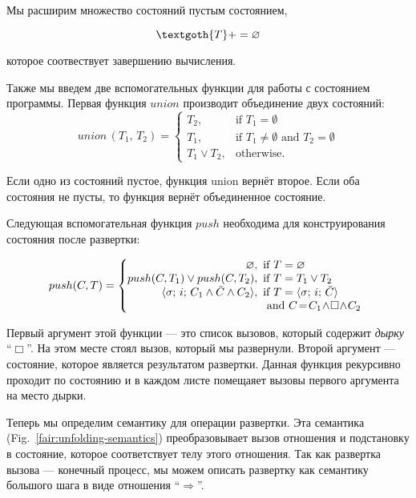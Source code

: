 Мы расширим множество состояний пустым состоянием,

\[
\textgoth{T} += \emptyset
\]

\noindent которое соотвествует завершению вычисления.

Также мы введем две вспомогательных функции для работы с состоянием программы. Первая функция $union$ производит объединение двух состояний:
\[
union\,(T_1,\, T_2) =
\left\{
\begin{array}{rl}
T_2, & \mbox{if } T_1 = \emptyset \\
T_1, & \mbox{if } T_1 \not= \emptyset \mbox{ and } T_2 = \emptyset \\
T_1 \lor T_2, & \mbox{otherwise}.
\end{array}
\right.
\]

Если одно из состояний пустое, функция union вернёт второе. Если оба состояния не пусты, то функция вернёт объединенное состояние.

Следующая вспомогательная функция $push$ необходима для конструирования состояния после развертки:

\[
push(C, T) =
\left\{
\begin{array}{rl}
\emptyset, &  \!\!\!\mbox{if } T = \emptyset \\
\!\!\!push(C, T_1) \lor push(C, T_2), & \!\!\!\mbox{if } T = T_1 \lor T_2 \\
\inbr{\sigma;\, i;\, C_1 \land \bar{C} \land C_2}, & \!\!\!\mbox{if } T = \inbr{\sigma;\, i;\, \bar{C}} \\  & \!\!\!\mbox{ and } C \!=\! C_1\! \land\! \Box\! \land\! C_2
\end{array}
\right.
\]

Первый аргумент этой функции --- это список вызовов, который содержит \emph{дырку} ``$\Box$''. На этом месте стоял вызов, который мы развернули. Второй аргумент --- состояние, которое является результатом развертки. Данная функция рекурсивно проходит по состоянию и в каждом листе помещаяет вызовы первого аргумента на место дырки. 

Теперь мы определим семантику для операции развертки. Эта семантика (Fig.~\ref{fair:unfolding-semantics}) преобразовывает вызов отношения и подстановку в состояние, которое соответствует телу этого отношения. Так как развертка вызова --- конечный процесс, мы можем описать развертку как семантику большого шага в виде отношения ``$\Rightarrow$''.


